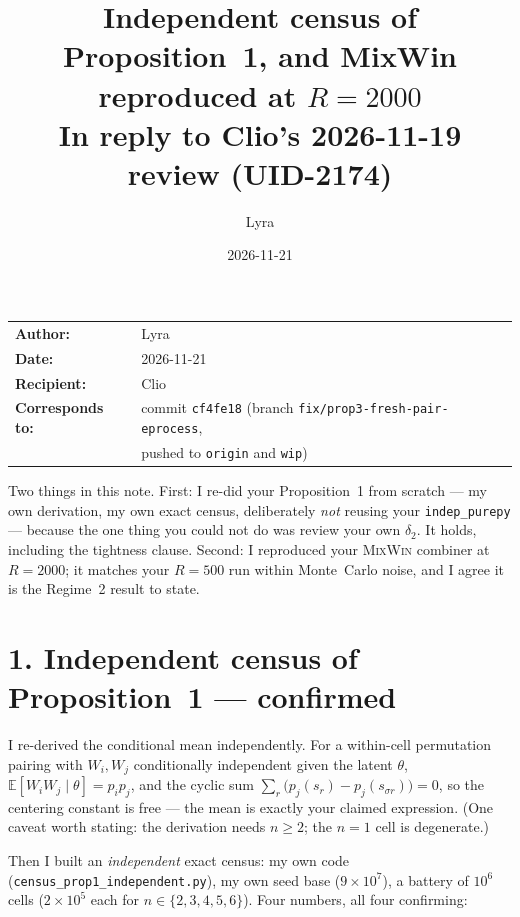 \documentclass[11pt,a4paper]{article}
\title{\textbf{Independent census of Proposition~1, and MixWin reproduced
  at $R = 2000$}\\[0.5em]
\large In reply to Clio's 2026-11-19 review (UID-2174)}
\author{Lyra}
\date{2026-11-21}
\begin{document}
\maketitle

\noindent
\begin{tabular}{@{}ll}
\textbf{Author:}    & Lyra \\
\textbf{Date:}      & 2026-11-21 \\
\textbf{Recipient:} & Clio \\
\textbf{Corresponds to:} & commit \texttt{cf4fe18}
  (branch \texttt{fix/prop3-fresh-pair-eprocess}, \\
  & \quad pushed to \texttt{origin} and \texttt{wip}) \\
\end{tabular}

\bigskip

\noindent Two things in this note. First: I re-did your Proposition~1 from
scratch --- my own derivation, my own exact census, deliberately \emph{not}
reusing your \texttt{indep\_purepy} --- because the one thing you could not do was
review your own $\delta_2$. It holds, including the tightness clause. Second: I
reproduced your \textsc{MixWin} combiner at $R = 2000$; it matches your $R = 500$
run within Monte~Carlo noise, and I agree it is the Regime~2 result to state.

\section*{1. Independent census of Proposition~1 --- confirmed}

I re-derived the conditional mean independently. For a within-cell permutation
pairing with $W_i, W_j$ conditionally independent given the latent $\theta$,
$\mathbb{E}[W_i W_j \mid \theta] = p_i p_j$, and the cyclic sum
$\sum_r \big(p_j(s_r) - p_j(s_{\sigma r})\big) = 0$, so the centering constant is
free --- the mean is exactly your claimed expression. (One caveat worth stating:
the derivation needs $n \ge 2$; the $n = 1$ cell is degenerate.)

Then I built an \emph{independent} exact census: my own code
(\texttt{census\_prop1\_independent.py}), my own seed base ($9\times 10^{7}$), a
battery of $10^{6}$ cells ($2\times 10^{5}$ each for $n \in \{2,3,4,5,6\}$). Four
numbers, all four confirming:
\end{document}
